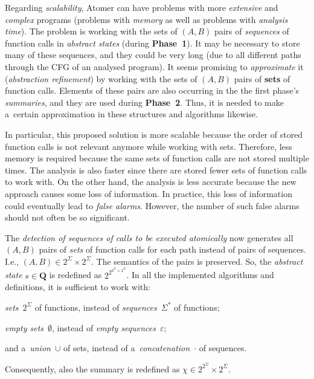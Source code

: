 \documentclass{ExcelAtFIT}
\theoremstyle{definition}
\begin{document}
Regarding \emph{scalability}, Atomer can have problems with more \emph{extensive} and \emph{complex} programs (problems with \emph{memory} as well as problems with \emph{analysis time}). The problem is working with the sets of ${ (A, B) }$ pairs of \emph{sequences} of function calls in \emph{abstract states} (during \textbf{Phase~1}). It may be necessary to store many of these sequences, and they could be very long (due to all different paths through the CFG of an analysed program). It seems promising to \emph{approximate} it (\emph{abstraction refinement}) by working with the sets of ${ (A, B) }$ pairs of \textbf{sets} of function calls. Elements of these pairs are also occurring in the the first phase's \emph{summaries}, and they are used during \textbf{Phase~2}. Thus, it is needed to make a~certain approximation in these structures and algorithms likewise.

In particular, this proposed solution is more scalable because the order of stored function calls is not relevant anymore while working with sets. Therefore, less memory is required because the same sets of function calls are not stored multiple times. The analysis is also faster since there are stored fewer sets of function calls to work with. On the other hand, the analysis is less accurate because the new approach causes some loss of information. In practice, this loss of information could eventually lead to \emph{false alarms}. However, the number of such false alarms should not often be so significant.

The \emph{detection of sequences of calls to be executed atomically} now generates all ${ (A, B) }$ pairs of \emph{sets} of function calls for each path instead of pairs of sequences. I.e., $ {(A, B)} \in 2^\Sigma \times 2^\Sigma $. The semantics of the pairs is preserved. So, the \emph{abstract state} $ s \in \boldsymbol{Q} $ is redefined as $ 2^{2^{2^\Sigma \times 2^\Sigma}} $. In all the implemented algorithms and definitions, it is sufficient to work with:
\begin{enumerate*}[label={(\roman*)}]
    \item \emph{sets}~$ 2^\Sigma $ of functions, instead of \emph{sequences}~$ \Sigma^* $ of functions;

    \item \emph{empty sets}~$ \emptyset $, instead of \emph{empty sequences}~$ \varepsilon $;
    
    \item and a~\emph{union}~$ \cup $ of sets, instead of a~\emph{concatenation}~$ \cdot $ of sequences.
\end{enumerate*}
Consequently, also the summary is redefined as $ \chi \in 2^{2^\Sigma} \times 2^\Sigma $.
\end{document}
